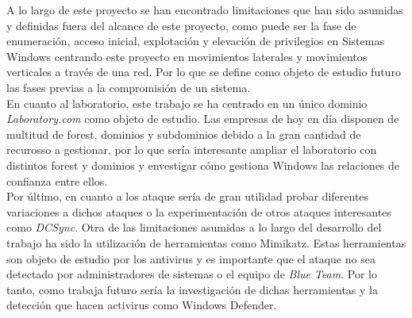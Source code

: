 A lo largo de este proyecto se han encontrado limitaciones que han sido asumidas y definidas fuera del alcance de este proyecto, como puede ser la fase de enumeración, acceso inicial, explotación y elevación de privilegios en Sistemas Windows centrando este proyecto en movimientos laterales y movimientos verticales a través de una red. Por lo que se define como objeto de estudio futuro las fases previas a la compromisión de un sistema. \\

En cuanto al laboratorio, este trabajo se ha centrado en un único dominio {\it Laboratory.com} como objeto de estudio. Las empresas de hoy en día disponen de multitud de forest, dominios y subdominios debido a la gran cantidad de recurosso a gestionar, por lo que sería interesante ampliar el laboratorio con distintos forest y dominios y envestigar cómo gestiona Windows las relaciones de confianza entre ellos. \\

Por último, en cuanto a los ataque sería de gran utilidad probar diferentes variaciones a dichos ataques o la experimentación de otros ataques interesantes como {\it DCSync}. Otra de las limitaciones asumidas a lo largo del desarrollo del trabajo ha sido la utilización de herramientas como Mimikatz. Estas herramientas son objeto de estudio por los antivirus y es importante que el ataque no sea detectado por administradores de sistemas o el equipo de {\it Blue Team}. Por lo tanto, como trabaja futuro sería la investigación de dichas herramientas y la detección que hacen activirus como Windows Defender.
